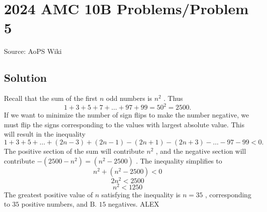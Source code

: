 \documentclass[12pt]{article}
\begin{document}
\section*{{2024 AMC 10B Problems/Problem 5}}
Source: AoPS Wiki

\subsection*{Solution}
Recall that the sum of the first $n$ odd numbers is $n^2$ . Thus \[1 + 3 + 5 + 7+ \dots + 97 + 99 = 50^2 = 2500.\] If we want to minimize the number of sign flips to make the number negative, we must flip the signs corresponding to the values with largest absolute value. This will result in the inequality \[1 + 3 + 5 +\dots + (2n - 3) + (2n - 1) - (2n + 1) - (2n + 3)-\dots - 97 - 99 < 0.\] The positive section of the sum will contribute $n^2$ , and the negative section will contribute $-(2500-n^2) = (n^2 - 2500)$ . The inequality simplifies to \[n^2 + (n^2 - 2500) < 0\] \[2n^2 < 2500\] \[n^2 < 1250\] The greatest positive value of $n$ satisfying the inequality is $n = 35$ , corresponding to $35$ positive numbers, and $\boxed{\text{B. } 15}$ negatives. ALEX
\end{document}
